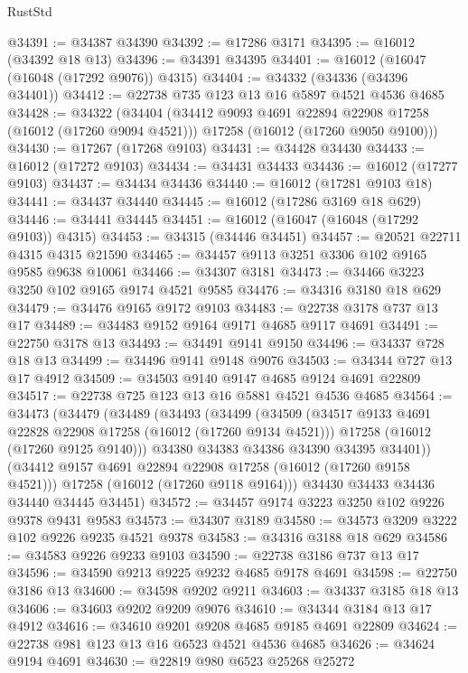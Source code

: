 \begin{lexlean}{RustStd}
\begin{coremodule}
@34391 := @34387 @34390
@34392 := @17286 @3171
@34395 := @16012 (@34392 @18 @13)
@34396 := @34391 @34395
@34401 := @16012 (@16047 (@16048 (@17292 @9076)) @4315)
@34404 := @34332 (@34336 (@34396 @34401))
@34412 := @22738 @735 @123 @13 @16 @5897 @4521 @4536 @4685
@34428 := @34322
    (@34404
      (@34412 @9093 @4691 @22894 @22908 @17258 (@16012 (@17260 @9094 @4521)))
      @17258
      (@16012 (@17260 @9050 @9100)))
@34430 := @17267 (@17268 @9103)
@34431 := @34428 @34430
@34433 := @16012 (@17272 @9103)
@34434 := @34431 @34433
@34436 := @16012 (@17277 @9103)
@34437 := @34434 @34436
@34440 := @16012 (@17281 @9103 @18)
@34441 := @34437 @34440
@34445 := @16012 (@17286 @3169 @18 @629)
@34446 := @34441 @34445
@34451 := @16012 (@16047 (@16048 (@17292 @9103)) @4315)
@34453 := @34315 (@34446 @34451)
@34457 := @20521 @22711 @4315 @4315 @21590
@34465 := @34457 @9113 @3251 @3306 @102 @9165 @9585 @9638 @10061
@34466 := @34307 @3181
@34473 := @34466 @3223 @3250 @102 @9165 @9174 @4521 @9585
@34476 := @34316 @3180 @18 @629
@34479 := @34476 @9165 @9172 @9103
@34483 := @22738 @3178 @737 @13 @17
@34489 := @34483 @9152 @9164 @9171 @4685 @9117 @4691
@34491 := @22750 @3178 @13
@34493 := @34491 @9141 @9150
@34496 := @34337 @728 @18 @13
@34499 := @34496 @9141 @9148 @9076
@34503 := @34344 @727 @13 @17 @4912
@34509 := @34503 @9140 @9147 @4685 @9124 @4691 @22809
@34517 := @22738 @725 @123 @13 @16 @5881 @4521 @4536 @4685
@34564 := @34473
    (@34479
      (@34489
        (@34493
          (@34499
            (@34509
              (@34517 @9133 @4691 @22828 @22908 @17258 (@16012 (@17260 @9134 @4521)))
              @17258
              (@16012 (@17260 @9125 @9140)))
            @34380
            @34383
            @34386
            @34390
            @34395
            @34401))
        (@34412 @9157 @4691 @22894 @22908 @17258 (@16012 (@17260 @9158 @4521)))
        @17258
        (@16012 (@17260 @9118 @9164)))
      @34430
      @34433
      @34436
      @34440
      @34445
      @34451)
@34572 := @34457 @9174 @3223 @3250 @102 @9226 @9378 @9431 @9583
@34573 := @34307 @3189
@34580 := @34573 @3209 @3222 @102 @9226 @9235 @4521 @9378
@34583 := @34316 @3188 @18 @629
@34586 := @34583 @9226 @9233 @9103
@34590 := @22738 @3186 @737 @13 @17
@34596 := @34590 @9213 @9225 @9232 @4685 @9178 @4691
@34598 := @22750 @3186 @13
@34600 := @34598 @9202 @9211
@34603 := @34337 @3185 @18 @13
@34606 := @34603 @9202 @9209 @9076
@34610 := @34344 @3184 @13 @17 @4912
@34616 := @34610 @9201 @9208 @4685 @9185 @4691 @22809
@34624 := @22738 @981 @123 @13 @16 @6523 @4521 @4536 @4685
@34626 := @34624 @9194 @4691
@34630 := @22819 @980 @6523 @25268 @25272

\end{coremodule}
\end{lexlean}

